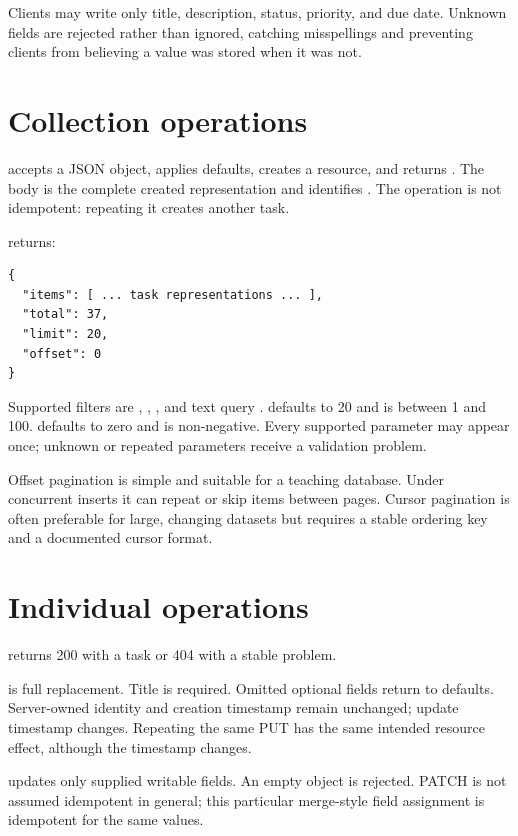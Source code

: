 Clients may write only title, description, status, priority, and due date.
Unknown fields are rejected rather than ignored, catching misspellings and
preventing clients from believing a value was stored when it was not.

\section{Collection operations}

 accepts a JSON object, applies defaults, creates a resource,
and returns . The body is the complete created representation
and  identifies . The operation is not
idempotent: repeating it creates another task.

 returns:

\begin{lstlisting}[style=wire]
{
  "items": [ ... task representations ... ],
  "total": 37,
  "limit": 20,
  "offset": 0
}
\end{lstlisting}

Supported filters are , , , and
text query .  defaults to 20 and is between 1 and 100.
 defaults to zero and is non-negative. Every supported parameter
may appear once; unknown or repeated parameters receive a validation problem.

Offset pagination is simple and suitable for a teaching database. Under
concurrent inserts it can repeat or skip items between pages. Cursor pagination
is often preferable for large, changing datasets but requires a stable ordering
key and a documented cursor format.

\section{Individual operations}

 returns 200 with a task or 404 with a stable
 problem.

 is full replacement. Title is required. Omitted
optional fields return to defaults. Server-owned identity and creation timestamp
remain unchanged; update timestamp changes. Repeating the same PUT has the same
intended resource effect, although the timestamp changes.

 updates only supplied writable fields. An empty
object is rejected. PATCH is not assumed idempotent in general; this particular
merge-style field assignment is idempotent for the same values.

